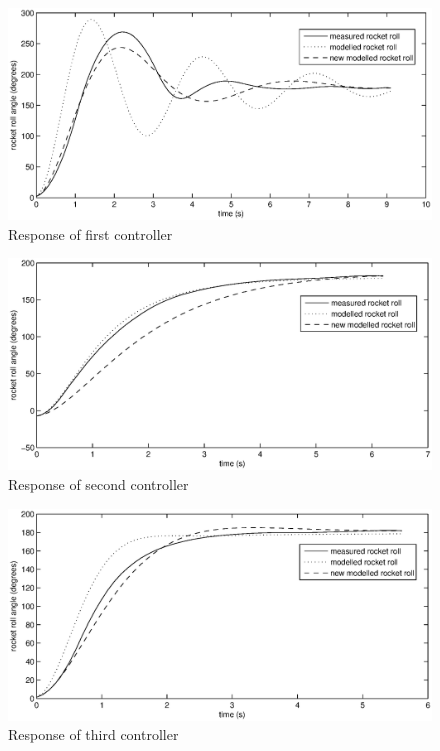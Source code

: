 \documentclass[a4paper,12pt]{article}
\begin{document}
    \begin{figure}[p]
      \centering
      \includegraphics[height=0.25\textheight]{one}
      \caption{Response of first controller}
      \label{fig:one}
    \end{figure}

    \begin{figure}[p]
      \centering
      \includegraphics[height=0.25\textheight]{two}
      \caption{Response of second controller}
      \label{fig:two}
    \end{figure}

    \begin{figure}[p]
      \centering
      \includegraphics[height=0.25\textheight]{three}
      \caption{Response of third controller}
      \label{fig:three}
    \end{figure}
\end{document}
